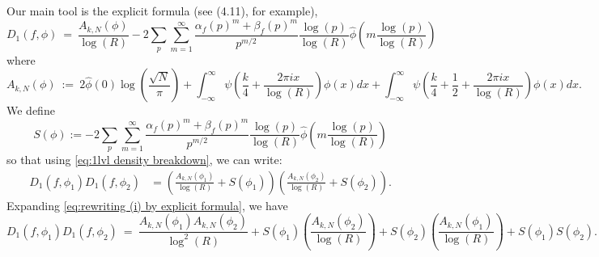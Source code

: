 \documentclass[11pt, reqno]{amsart}
\theoremstyle{definition}
\theoremstyle{remark}
\numberwithin{equation}{section}
\renewcommand{\hat}{\widehat}
\begin{document}
Our main tool is the explicit formula (see \cite{ILS2} (4.11), for example), \begin{equation}\label{eq:1lvl density breakdown}
    D_1(f, \phi) \ = \ \frac{A_{k,N}(\phi)}{\log(R)} - 2\sum_{p}\sum_{m=1}^\infty \frac{\alpha_f(p)^{m}+\beta_f(p)^{m}}{p^{m/2}} \frac{\log(p)}{\log(R) } \hat\phi\left(m \frac{\log(p)}{\log(R) }\right)
\end{equation} where 
    $$A_{k,N} (\phi)\ :=\  2\hat\phi(0)\log\left(\frac{\sqrt{N}}{\pi} \right) + \int_{-\infty}^\infty \psi\left(\frac{k}{4}+ \frac{2\pi i x}{\log(R) }\right)\phi(x)dx + \int_{-\infty}^\infty \psi\left(\frac{k}{4}+ \frac{1}{2} +\frac{2\pi i x}{\log(R)}\right)\phi(x)dx . $$
We define
$$S(\phi):=-2\sum_{p}\sum_{m=1}^\infty \frac{\alpha_f(p)^{m}+\beta_f(p)^{m}}{p^{m/2}} \frac{\log(p)}{\log(R) } \hat\phi\left(m \frac{\log(p)}{\log(R) }\right)$$
so that using \eqref{eq:1lvl density breakdown}, we can write: 
\begin{align}
     D_1(f, \phi_1)D_1(f, \phi_2)&= \left(\frac{A_{k,N}(\phi_1)}{\log(R)} +S(\phi_1)\right)\left(\frac{A_{k,N}(\phi_2)}{\log(R)} +S(\phi_2)\right).
    \label{eq:rewriting (i) by explicit formula}
\end{align}
Expanding \eqref{eq:rewriting (i) by explicit formula}, we have \begin{equation}
     D_1(f, \phi_1)D_1(f, \phi_2) \ = \ \frac{A_{k,N}(\phi_1)A_{k,N}(\phi_2)}{\log^2(R)} +S(\phi_1)\left(\frac{A_{k,N}(\phi_{2})}{\log(R)}\right) +S(\phi_2)\left(\frac{A_{k,N}(\phi_{1})}{\log(R)}\right)+S(\phi_1)S(\phi_2).
\end{equation}
\end{document}
